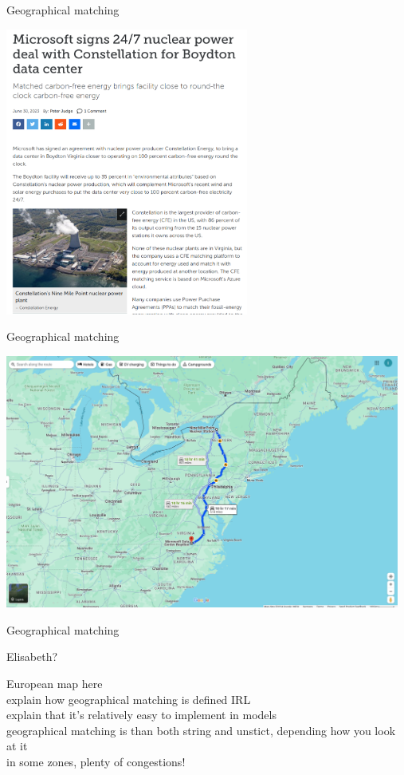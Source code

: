 \begin{frame}{Geographical matching}

  \includegraphics[width=8cm]{images/microsoft.png}

\end{frame}

\begin{frame}{Geographical matching}

  \includegraphics[width=13cm]{images/microsoft2.png}

\end{frame}
  

\begin{frame}{Geographical matching}

  Elisabeth?

  European map here\\
  explain how geographical matching is defined IRL\\
  explain that it's relatively easy to implement in models\\
  geographical matching is than both string and unstict, depending how you look at it\\
  in some zones, plenty of congestions!\\
\end{frame}


